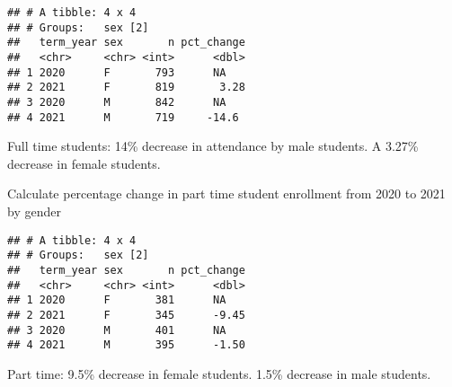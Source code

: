 \documentclass[]{article}
\newenvironment{Shaded}{\begin{snugshade}}{\end{snugshade}}
\newcommand{\CommentTok}[1]{\textcolor[rgb]{0.56,0.35,0.01}{\textit{#1}}}
\newcommand{\DataTypeTok}[1]{\textcolor[rgb]{0.13,0.29,0.53}{#1}}
\newcommand{\DecValTok}[1]{\textcolor[rgb]{0.00,0.00,0.81}{#1}}
\newcommand{\KeywordTok}[1]{\textcolor[rgb]{0.13,0.29,0.53}{\textbf{#1}}}
\newcommand{\NormalTok}[1]{#1}
\newcommand{\OperatorTok}[1]{\textcolor[rgb]{0.81,0.36,0.00}{\textbf{#1}}}
\newcommand{\OtherTok}[1]{\textcolor[rgb]{0.56,0.35,0.01}{#1}}
\newcommand{\StringTok}[1]{\textcolor[rgb]{0.31,0.60,0.02}{#1}}
\begin{document}
\begin{verbatim}
## # A tibble: 4 x 4
## # Groups:   sex [2]
##   term_year sex       n pct_change
##   <chr>     <chr> <int>      <dbl>
## 1 2020      F       793      NA   
## 2 2021      F       819       3.28
## 3 2020      M       842      NA   
## 4 2021      M       719     -14.6
\end{verbatim}

Full time students: 14\% decrease in attendance by male students. A
3.27\% decrease in female students.

Calculate percentage change in part time student enrollment from 2020 to
2021 by gender

\begin{Shaded}
\end{Shaded}

\begin{verbatim}
## # A tibble: 4 x 4
## # Groups:   sex [2]
##   term_year sex       n pct_change
##   <chr>     <chr> <int>      <dbl>
## 1 2020      F       381      NA   
## 2 2021      F       345      -9.45
## 3 2020      M       401      NA   
## 4 2021      M       395      -1.50
\end{verbatim}

Part time: 9.5\% decrease in female students. 1.5\% decrease in male
students.
\end{document}
